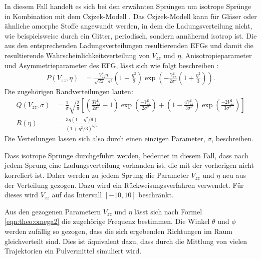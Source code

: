 In diesem Fall handelt es sich bei den erwähnten Sprüngen um isotrope Sprünge in Kombination mit dem Czjzek-Modell \cite{czjzek_atomic_1981}. Das Czjzek-Modell kann für Gläser oder ähnliche amorphe Stoffe angewandt werden, in dem die Ladungsverteilung nicht, wie beispielsweise durch ein Gitter, periodisch, sondern annähernd isotrop ist. Die aus den entsprechenden Ladungsverteilungen resultierenden EFGs und damit die resultierende Wahrscheinlichkeitsverteilung von $V_{zz}$ und $\eta$, Anisotropieparameter und Asymmetrieparameter des EFG, lässt sich wie folgt beschreiben \cite{caer}:
\begin{align}
	P \left( V_{zz}, \eta \right) & = \frac{V_{zz}^4 \eta}{\sqrt{2 \pi} \cdot \sigma^5} \left( 1 - \frac{\eta^2}{9} \right)\exp \left( - \frac{V_{zz}^2}{2 \sigma^2} \left( 1 + \frac{\eta^2}{3} \right) \right). \label{eqn:sim:czjzek}
\end{align}
Die zugehörigen Randverteilungen lauten:
\begin{align}
    Q (V_{zz}, \sigma) &= \frac{1}{\sigma} \sqrt{\frac{2}{\pi}} \left[ \left( \frac{3 V_{zz}^2}{2 \sigma^2} - 1 \right) \exp{ \left( \frac{- V_{zz}^2}{2 \sigma^2} \right) } + \left( 1 - \frac{4 V_{zz}^2}{3 \sigma^2} \right) \exp{ \left( \frac{-2 V_{zz}^2}{3 \sigma^2} \right) } \right] \label{eqn:sim:czjzek_Q} \\
    R(\eta) &= \frac{3\eta (1 - \eta^2 / 9)}{(1 + \eta^2 / 3)^{5/2}} \label{eqn:sim:czjzek_R}
\end{align}
Die Verteilungen lassen sich also durch einen einzigen Parameter, $\sigma$, beschreiben.

Dass isotrope Sprünge durchgeführt werden, bedeutet in diesem Fall, dass nach jedem Sprung eine Ladungsverteilung vorhanden ist, die mit der vorherigen nicht korreliert ist. Daher werden zu jedem Sprung die Parameter $V_{zz}$ und $\eta$ neu aus der Verteilung gezogen. Dazu wird ein Rückweisungsverfahren verwendet. Für dieses wird $V_{zz}$ auf das Intervall $\left[-10, 10 \right]$ beschränkt.

Aus den gezogenen Parametern $V_{zz}$ und $\eta$ lässt sich nach Formel \ref{eqn:theo:omega2} die zugehörige Frequenz bestimmen. Die Winkel $\theta$ und $\phi$ werden zufällig so gezogen, dass die sich ergebenden Richtungen im Raum gleichverteilt sind. Dies ist äquivalent dazu, dass durch die Mittlung von vielen Trajektorien ein Pulvermittel simuliert wird.







